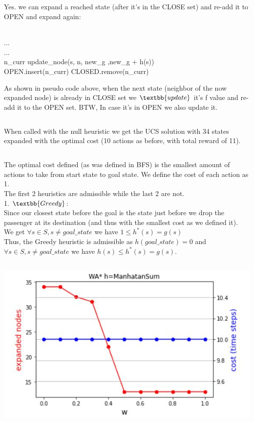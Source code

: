 \documentclass[12pt]{article}
\begin{document}
\subsection{}
Yes. we can expand a reached state (after it's in the CLOSE set) and re-add it to OPEN and expand again:\\
\begin{algorithmic}
\\
    ...
\\
    ...
\Else {}\\
        \State n\_curr \gets update\_node(s, n, new\_g ,new\_g + h(s))\\
        \State OPEN.insert(n\_curr)
        \State CLOSED.remove(n\_curr)
    \EndIf
\EndIf 
\end{algorithmic}
As shown in pseudo code above, when the next state (neighbor of the now expanded node) is already in CLOSE set we $\textbb{update}$ it's f value and re-add it to the OPEN set.
BTW, In case it's in OPEN we also update it.

\subsection{}
When called with the null heuristic we get the UCS solution with 34 states expanded with the optimal cost (10 actions as before, with total reward of 11).

\subsection{}
The optimal cost defined (as was defined in BFS) is the smallest amount of actions to take from start state to goal state. We define the cost of each action as 1.\\
The first 2 heuristics are admissible while the last 2 are not.\\
1. $\textbb{Greedy}$:\\
Since our closest state before the goal is the state just before we drop the passenger at its destination (and thus with the smallest cost as we defined it).\\
We get $\forall s\in S, s \neq goal\_state$ we have $1 \leq h^*(s) = g(s)$\\
Thus, the Greedy heuristic is admissible as $h(goal\_state) = 0$ and $\forall s\in S, s \neq goal\_state$  we have $h(s) \leq h^*(s) = g(s)$. 

\subsection{}
\includegraphics[scale=1]{w_graph.JPG}\\
\end{document}
